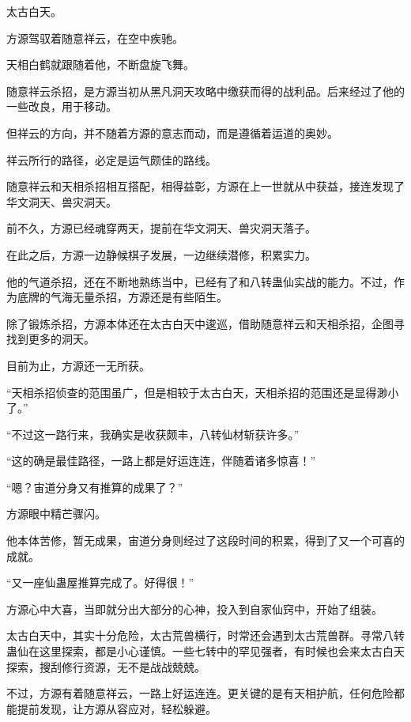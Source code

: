 
\begin{this_body}



太古白天。

方源驾驭着随意祥云，在空中疾驰。

天相白鹤就跟随着他，不断盘旋飞舞。

随意祥云杀招，是方源当初从黑凡洞天攻略中缴获而得的战利品。后来经过了他的一些改良，用于移动。

但祥云的方向，并不随着方源的意志而动，而是遵循着运道的奥妙。

祥云所行的路径，必定是运气颇佳的路线。

随意祥云和天相杀招相互搭配，相得益彰，方源在上一世就从中获益，接连发现了华文洞天、兽灾洞天。

前不久，方源已经魂穿两天，提前在华文洞天、兽灾洞天落子。

在此之后，方源一边静候棋子发展，一边继续潜修，积累实力。

他的气道杀招，还在不断地熟练当中，已经有了和八转蛊仙实战的能力。不过，作为底牌的气海无量杀招，方源还是有些陌生。

除了锻炼杀招，方源本体还在太古白天中逡巡，借助随意祥云和天相杀招，企图寻找到更多的洞天。

目前为止，方源还一无所获。

“天相杀招侦查的范围虽广，但是相较于太古白天，天相杀招的范围还是显得渺小了。”

“不过这一路行来，我确实是收获颇丰，八转仙材斩获许多。”

“这的确是最佳路径，一路上都是好运连连，伴随着诸多惊喜！”

“嗯？宙道分身又有推算的成果了？”

方源眼中精芒骤闪。

他本体苦修，暂无成果，宙道分身则经过了这段时间的积累，得到了又一个可喜的成就。

“又一座仙蛊屋推算完成了。好得很！”

方源心中大喜，当即就分出大部分的心神，投入到自家仙窍中，开始了组装。

太古白天中，其实十分危险，太古荒兽横行，时常还会遇到太古荒兽群。寻常八转蛊仙在这里探索，都是小心谨慎。一些七转中的罕见强者，有时候也会来太古白天探索，搜刮修行资源，无不是战战兢兢。

不过，方源有着随意祥云，一路上好运连连。更关键的是有天相护航，任何危险都能提前发现，让方源从容应对，轻松躲避。


\end{this_body}
